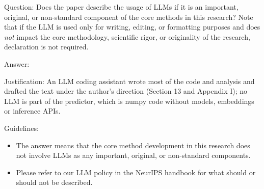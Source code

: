 \documentclass[
]{article}
\begin{document}
\begin{enumerate}
  Question: Does the paper describe the usage of LLMs if it is an
  important, original, or non-standard component of the core methods in
  this research? Note that if the LLM is used only for writing, editing,
  or formatting purposes and does \emph{not} impact the core
  methodology, scientific rigor, or originality of the research,
  declaration is not required.

  Answer: \answerYes{}

  Justification: An LLM coding assistant wrote most of the code and
  analysis and drafted the text under the author's direction (Section 13
  and Appendix I); no LLM is part of the predictor, which is numpy code
  without models, embeddings or inference APIs.

  Guidelines:

  \begin{itemize}
  \item
    The answer \answerNA{} means that the core method development in
    this research does not involve LLMs as any important, original, or
    non-standard components.
  \item
    Please refer to our LLM policy in the NeurIPS handbook for what
    should or should not be described.
  \end{itemize}
\end{enumerate}
\end{document}

